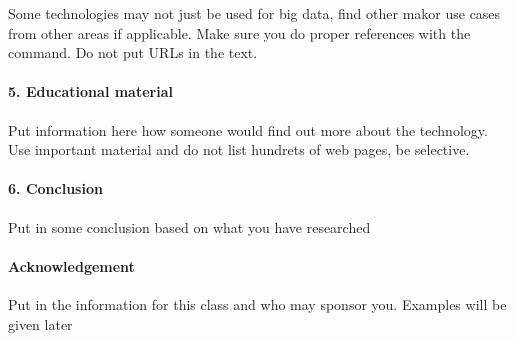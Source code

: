 \documentclass[9pt,twocolumn,twoside]{../../styles/osajnl}
\begin{document}
Some technologies may not just be used for big data, find other makor
use cases from other areas if applicable.  Make sure you do proper
references with the \cite{?} command. Do not put URLs in the text.

\paragraph{5. Educational material}

Put information here how someone would find out more about the
technology. Use important material and do not list hundrets of web
pages, be selective.

\paragraph{6. Conclusion}

Put in some conclusion based on what you have researched

\paragraph{Acknowledgement}

Put in the information for this class and who may sponsor
you. Examples will be given later
\end{document}
